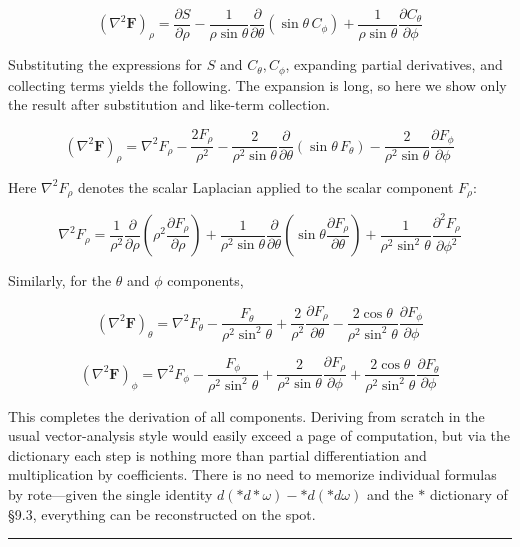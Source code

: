 \[(\nabla^2\mathbf{F})_\rho = \frac{\partial S}{\partial\rho} - \frac{1}{\rho\sin\theta}\frac{\partial}{\partial\theta}(\sin\theta\,C_\phi) + \frac{1}{\rho\sin\theta}\frac{\partial C_\theta}{\partial\phi}\]

Substituting the expressions for \(S\) and \(C_\theta, C_\phi\),
expanding partial derivatives, and collecting terms yields the
following. The expansion is long, so here we show only the result after
substitution and like-term collection.

\[(\nabla^2\mathbf{F})_\rho = \nabla^2 F_\rho - \frac{2F_\rho}{\rho^2} - \frac{2}{\rho^2\sin\theta}\frac{\partial}{\partial\theta}(\sin\theta\,F_\theta) - \frac{2}{\rho^2\sin\theta}\frac{\partial F_\phi}{\partial\phi}\]

Here \(\nabla^2 F_\rho\) denotes the scalar Laplacian applied to the
scalar component \(F_\rho\):

\[\nabla^2 F_\rho = \frac{1}{\rho^2}\frac{\partial}{\partial\rho}\!\left(\rho^2\frac{\partial F_\rho}{\partial\rho}\right) + \frac{1}{\rho^2\sin\theta}\frac{\partial}{\partial\theta}\!\left(\sin\theta\frac{\partial F_\rho}{\partial\theta}\right) + \frac{1}{\rho^2\sin^2\theta}\frac{\partial^2 F_\rho}{\partial\phi^2}\]

Similarly, for the \(\theta\) and \(\phi\) components,

\[(\nabla^2\mathbf{F})_\theta = \nabla^2 F_\theta - \frac{F_\theta}{\rho^2\sin^2\theta} + \frac{2}{\rho^2}\frac{\partial F_\rho}{\partial\theta} - \frac{2\cos\theta}{\rho^2\sin^2\theta}\frac{\partial F_\phi}{\partial\phi}\]

\[(\nabla^2\mathbf{F})_\phi = \nabla^2 F_\phi - \frac{F_\phi}{\rho^2\sin^2\theta} + \frac{2}{\rho^2\sin\theta}\frac{\partial F_\rho}{\partial\phi} + \frac{2\cos\theta}{\rho^2\sin^2\theta}\frac{\partial F_\theta}{\partial\phi}\]

This completes the derivation of all components. Deriving from scratch
in the usual vector-analysis style would easily exceed a page of
computation, but via the dictionary each step is nothing more than
partial differentiation and multiplication by coefficients. There is no
need to memorize individual formulas by rote---given the single identity
\(d(\ast d\ast\omega)-\ast d(\ast d\omega)\) and the \(\ast\) dictionary
of §9.3, everything can be reconstructed on the spot.

\begin{center}\rule{0.5\linewidth}{0.5pt}\end{center}

